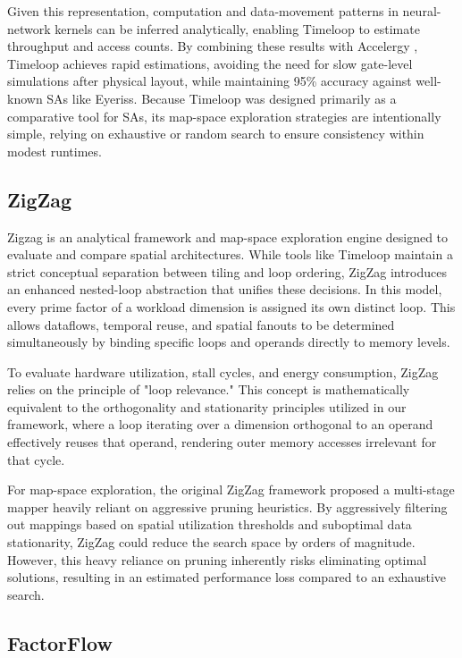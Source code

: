 Given this representation, computation and data-movement patterns in neural-network kernels can be inferred analytically, enabling Timeloop to estimate throughput and access counts. By combining these results with Accelergy \cite{wu2019accelergy}, Timeloop achieves rapid estimations, avoiding the need for slow gate-level simulations after physical layout, while maintaining 95\% accuracy against well-known SAs like Eyeriss. Because Timeloop was designed primarily as a comparative tool for SAs, its map-space exploration strategies are intentionally simple, relying on exhaustive or random search to ensure consistency within modest runtimes.



\subsection{ZigZag}
\label{sec: rw-zigzag}
Zigzag \cite{zigzag} is an analytical framework and map-space exploration engine designed to evaluate and compare spatial architectures. While tools like Timeloop maintain a strict conceptual separation between tiling and loop ordering, ZigZag introduces an enhanced nested-loop abstraction that unifies these decisions. In this model, every prime factor of a workload dimension is assigned its own distinct loop. This allows dataflows, temporal reuse, and spatial fanouts to be determined simultaneously by binding specific loops and operands directly to memory levels. 

To evaluate hardware utilization, stall cycles, and energy consumption, ZigZag relies on the principle of "loop relevance." This concept is mathematically equivalent to the orthogonality and stationarity principles utilized in our framework, where a loop iterating over a dimension orthogonal to an operand effectively reuses that operand, rendering outer memory accesses irrelevant for that cycle. 

For map-space exploration, the original ZigZag framework proposed a multi-stage mapper heavily reliant on aggressive pruning heuristics. By aggressively filtering out mappings based on spatial utilization thresholds and suboptimal data stationarity, ZigZag could reduce the search space by orders of magnitude. However, this heavy reliance on pruning inherently risks eliminating optimal solutions, resulting in an estimated performance loss compared to an exhaustive search. 

\subsection{FactorFlow}
\label{sec:rw-factorflow}

